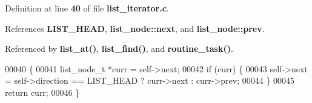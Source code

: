 Definition at line \textbf{ 40} of file \textbf{ list\+\_\+iterator.\+c}.



References \textbf{ L\+I\+S\+T\+\_\+\+H\+E\+AD}, \textbf{ list\+\_\+node\+::next}, and \textbf{ list\+\_\+node\+::prev}.



Referenced by \textbf{ list\+\_\+at()}, \textbf{ list\+\_\+find()}, and \textbf{ routine\+\_\+task()}.


\begin{DoxyCode}
00040                                                        \{
00041   list_node_t *curr = \textcolor{keyword}{self}->next;
00042   \textcolor{keywordflow}{if} (curr) \{
00043     \textcolor{keyword}{self}->next = \textcolor{keyword}{self}->direction == LIST_HEAD ? curr->next : curr->prev;
00044   \}
00045   \textcolor{keywordflow}{return} curr;
00046 \}
\end{DoxyCode}
